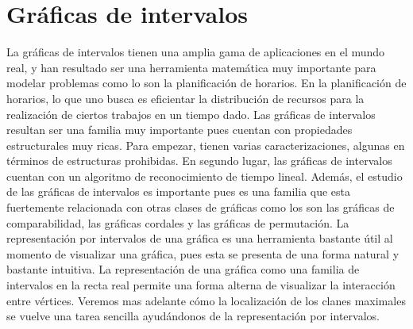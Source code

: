 \chapter{Gráficas de intervalos}
\label{cap:GrafInt}

La gráficas de intervalos tienen una amplia gama de aplicaciones en el mundo real, y han resultado ser una herramienta matemática muy importante para modelar problemas como lo son la planificación de horarios. En la planificación de horarios, lo que uno busca es eficientar la distribución de recursos para la realización de ciertos trabajos en un tiempo dado. 
Las gráficas de intervalos resultan ser una familia muy importante pues cuentan con propiedades estructurales muy ricas. Para empezar, tienen varias caracterizaciones, algunas en términos de estructuras prohibidas. En segundo lugar, las gráficas de intervalos cuentan con un algoritmo de reconocimiento de tiempo lineal. Además, el estudio de las gráficas de intervalos es importante pues es una familia que esta fuertemente relacionada con otras clases de gráficas como los son las gráficas de comparabilidad, las gráficas cordales y las gráficas de permutación. 
La representación por intervalos de una gráfica es una herramienta bastante útil al momento de visualizar una gráfica, pues esta  se presenta de una forma natural y bastante intuitiva. La representación de una gráfica como una familia de intervalos en la recta real permite una forma alterna de visualizar la interacción entre vértices. Veremos mas adelante c\'omo la localización de los clanes maximales se vuelve una tarea sencilla ayudándonos de la representación por intervalos.

